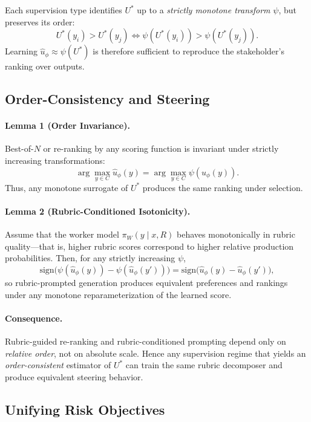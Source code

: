 \documentclass[sigconf]{acmart}
\begin{document}
Each supervision type identifies \(U^*\) up to a \emph{strictly monotone transform} \(\psi\), but preserves its order:
\[
U^*(y_i) > U^*(y_j) \iff \psi(U^*(y_i)) > \psi(U^*(y_j)).
\]
Learning \(\hat{u}_\phi \approx \psi(U^*)\) is therefore sufficient to reproduce the stakeholder’s ranking over outputs.

\subsection{Order-Consistency and Steering}

\paragraph{Lemma 1 (Order Invariance).}
Best-of-\(N\) or re-ranking by any scoring function is invariant under strictly increasing transformations:
\[
\arg\max_{y \in C} \hat{u}_\phi(y)
=
\arg\max_{y \in C} \psi(\hat{u}_\phi(y)).
\]
Thus, any monotone surrogate of \(U^*\) produces the same ranking under selection.

\paragraph{Lemma 2 (Rubric-Conditioned Isotonicity).}
Assume that the worker model \(\pi_W(y \mid x, R)\) behaves monotonically in rubric quality—that is, higher rubric scores correspond to higher relative production probabilities.
Then, for any strictly increasing \(\psi\),
\[
\text{sign}\big(\psi(\hat{u}_\phi(y)) - \psi(\hat{u}_\phi(y'))\big)
=
\text{sign}\big(\hat{u}_\phi(y) - \hat{u}_\phi(y')\big),
\]
so rubric-prompted generation produces equivalent preferences and rankings under any monotone reparameterization of the learned score.

\paragraph{Consequence.}
Rubric-guided re-ranking and rubric-conditioned prompting depend only on \emph{relative order}, not on absolute scale.
Hence any supervision regime that yields an \emph{order-consistent} estimator of \(U^*\) can train the same rubric decomposer and produce equivalent steering behavior.

\subsection{Unifying Risk Objectives}
\end{document}

